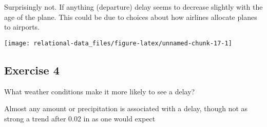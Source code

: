 \documentclass[]{book}
\newenvironment{Shaded}{\begin{snugshade}}{\end{snugshade}}
\newcommand{\CommentTok}[1]{\textcolor[rgb]{0.56,0.35,0.01}{\textit{#1}}}
\newcommand{\DataTypeTok}[1]{\textcolor[rgb]{0.13,0.29,0.53}{#1}}
\newcommand{\DecValTok}[1]{\textcolor[rgb]{0.00,0.00,0.81}{#1}}
\newcommand{\KeywordTok}[1]{\textcolor[rgb]{0.13,0.29,0.53}{\textbf{#1}}}
\newcommand{\NormalTok}[1]{#1}
\newcommand{\OperatorTok}[1]{\textcolor[rgb]{0.81,0.36,0.00}{\textbf{#1}}}
\newcommand{\StringTok}[1]{\textcolor[rgb]{0.31,0.60,0.02}{#1}}
\theoremstyle{plain}
\theoremstyle{remark}
\theoremstyle{definition}
\theoremstyle{definition}
\theoremstyle{definition}
\theoremstyle{remark}
\begin{document}
Surprisingly not. If anything (departure) delay seems to decrease
slightly with the age of the plane. This could be due to choices about
how airlines allocate planes to airports.

\begin{Shaded}
\end{Shaded}

\begin{center}\texttt{[image: relational-data\_files/figure-latex/unnamed-chunk-17-1]} \end{center}

\hypertarget{exercise-4-18}{%
\subsection{Exercise 4}\label{exercise-4-18}}

What weather conditions make it more likely to see a delay?

Almost any amount or precipitation is associated with a delay, though
not as strong a trend after 0.02 in as one would expect
\end{document}
